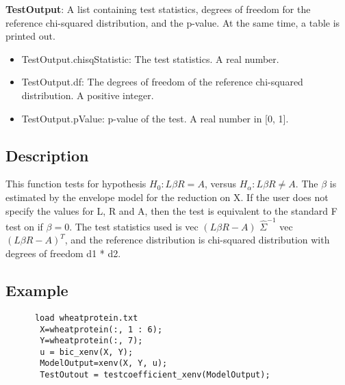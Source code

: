 \documentclass[a4paper,11pt,openany]{memoir}
\begin{document}
\begin{par}
\textbf{TestOutput}: A list containing test statistics, degrees of freedom for the reference chi-squared distribution, and the p-value.  At the same time, a table is printed out.
\end{par} \vspace{1em}
\begin{itemize}
\setlength{\itemsep}{-1ex}
   \item TestOutput.chisqStatistic: The test statistics. A real number.
   \item TestOutput.df: The degrees of freedom of the reference chi-squared distribution.  A positive integer.
   \item TestOutput.pValue: p-value of the test.  A real number in [0, 1].
\end{itemize}


\subsection*{Description}

\begin{par}
This function tests for hypothesis $H_0: L\beta R = A$, versus $H_\alpha: L\beta R\neq A$.  The $\beta$ is estimated by the envelope model for the reduction on X.  If the user does not specify the values for L, R and A, then the test is equivalent to the standard F test on if $\beta = 0$.  The test statistics used is vec $(L\beta R - A)$ $\hat{\Sigma}^{-1}$ vec $(L\beta R - A)^{T}$, and the reference distribution is chi-squared distribution with degrees of freedom d1 * d2.
\end{par} \vspace{1em}


\subsection*{Example}


\begin{verbatim}      load wheatprotein.txt
       X=wheatprotein(:, 1 : 6);
       Y=wheatprotein(:, 7);
       u = bic_xenv(X, Y);
       ModelOutput=xenv(X, Y, u);
       TestOutout = testcoefficient_xenv(ModelOutput);\end{verbatim}
    
\end{document}
